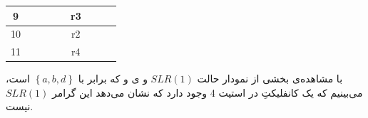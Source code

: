 \documentclass{article}
\begin{document}
\begin{latin}
\begin{table}[H]
\begin{tabular}{|ccccccccc|}
\multicolumn{1}{|c|}{{\color[HTML]{0000FF} 9}}         & \multicolumn{1}{c|}{}           & \multicolumn{1}{c|}{}           & \multicolumn{1}{c|}{}           & \multicolumn{1}{c|}{}           & \multicolumn{1}{c|}{r3}                         & \multicolumn{1}{c|}{}            & \multicolumn{1}{c|}{}                         &                          \\ \hline
\multicolumn{1}{|c|}{{\color[HTML]{0000FF} 10}}        & \multicolumn{1}{c|}{}           & \multicolumn{1}{c|}{}           & \multicolumn{1}{c|}{}           & \multicolumn{1}{c|}{}           & \multicolumn{1}{c|}{r2}                         & \multicolumn{1}{c|}{}            & \multicolumn{1}{c|}{}                         &                          \\ \hline
\multicolumn{1}{|c|}{{\color[HTML]{0000FF} 11}}        & \multicolumn{1}{c|}{}           & \multicolumn{1}{c|}{}           & \multicolumn{1}{c|}{}           & \multicolumn{1}{c|}{}           & \multicolumn{1}{c|}{r4}                         & \multicolumn{1}{c|}{}            & \multicolumn{1}{c|}{}                         &                          \\ \hline
\end{tabular}
\end{table}
\end{latin}

با مشاهده‌ی بخشی از نمودار حالت $SLR(1)$ و ی  و  که برابر با $\left\{ a, b, d \right\}$ است، می‌بینیم که یک کانفلیکتِ  در استیت 4 وجود دارد که نشان می‌دهد این گرامر $SLR(1)$ نیست.







\end{document}
